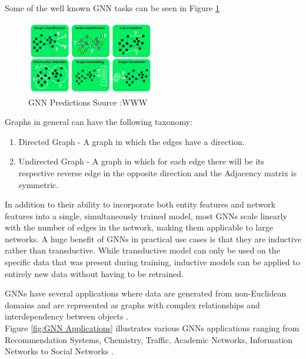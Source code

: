 \documentclass{report} %
\begin{document}
Some of the well known \ac{GNN} tasks can be seen in Figure \ref{fig:GNN Predictions}
\begin{figure}[H]
    \centering
    \includegraphics[width=0.5\textwidth]{./ReportImages/GraphTasks.png} 
    \caption{\ac{GNN} Predictions Source :WWW} 
    \label{fig:GNN Predictions}
\end{figure}
Graphs in general can have the following taxonomy: \cite{GNN-2019}

\begin{enumerate}
    \item Directed Graph - A graph in which the edges have a direction.
    \item Undirected Graph - A graph in which for each edge there will be its respective reverse edge in the opposite direction and the Adjacency matrix is symmetric.
\end{enumerate}

In addition to their ability to incorporate both entity features and network features into a single, simultaneously trained model, most GNNs scale linearly with the number of edges in the network, making them applicable to large
networks. A huge benefit of GNNs in practical use cases is that they are inductive rather than transductive. While transductive model can only be used on the specific data that was present during training, 
inductive models can be applied to entirely new data without having to be retrained. \cite{ML HGNN-2023}

\ac{GNN}s have several applications where data are generated from non-Euclidean domains and are represented as graphs with complex relationships and interdependency between objects \cite{GNN-2019}.\\
Figure \ref{fig:GNN Applications} illustrates various \ac{GNN}s applications ranging from Recommendation Systems, Chemistry, Traffic, Academic Networks, Information Networks to Social Networks \cite{HGNN-2020}.\\
\end{document}
